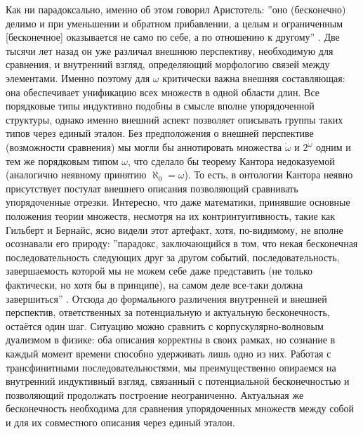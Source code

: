 \documentclass[12pt]{article}
\begin{document}
Как ни парадоксально, именно об этом говорил Аристотель: ''оно (бесконечно) делимо и при уменьшении и обратном прибавлении, а целым и ограниченным [бесконечное] оказывается не само по себе, а по отношению к другому'' \cite{aristotle-limit}. Две тысячи лет назад он уже различал внешнюю перспективу, необходимую для сравнения, и внутренний взгляд, определяющий морфологию связей между элементами. Именно поэтому для $\omega$ критически важна внешняя составляющая: она обеспечивает унификацию всех множеств в одной области длин. Все порядковые типы индуктивно подобны в смысле вполне упорядоченной структуры, однако именно внешний аспект позволяет описывать группы таких типов через единый эталон. Без предположения о внешней перспективе (возможности сравнения) мы могли бы аннотировать множества $\dot{\omega}$ и $2^{\dot{\omega}}$ одним и тем же порядковым типом $\omega$, что сделало бы теорему Кантора недоказуемой (аналогично неявному принятию $\aleph_0 = \omega$). То есть, в онтологии Кантора неявно присутствует постулат внешнего описания позволяющий сравнивать упорядоченные отрезки. Интересно, что даже математики, принявшие основные положения теории множеств, несмотря на их контринтуитивность, такие как Гильберт и Бернайс, ясно видели этот артефакт, хотя, по-видимому, не вполне осознавали его природу: ''парадокс, заключающийся в том, что некая бесконечная последовательность следующих друг за другом событий, последовательность, завершаемость которой мы не можем себе даже представить (не только фактически, но хотя бы в принципе), на самом деле все-таки должна завершиться'' \cite{gilbert-paradox}. Отсюда до формального различения внутренней и внешней перспектив, ответственных за потенциальную и актуальную бесконечность, остаётся один шаг. Ситуацию можно сравнить с корпускулярно-волновым дуализмом в физике: оба описания корректны в своих рамках, но сознание в каждый момент времени способно удерживать лишь одно из них. Работая с трансфинитными последовательностями, мы преимущественно опираемся на внутренний индуктивный взгляд, связанный с потенциальной бесконечностью и позволяющий продолжать построение неограниченно. Актуальная же бесконечность необходима для сравнения упорядоченных множеств между собой и для их совместного описания через единый эталон.
\end{document}
